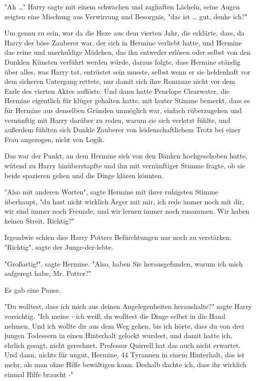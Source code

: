 {"Ah …" Harry sagte mit einem schwachen und zaghaften Lächeln, seine Augen zeigten eine Mischung aus Verwirrung und Besorgnis, "das ist … gut, denke ich?"

Um genau zu sein, war da die Hexe aus dem vierten Jahr, die erklärte, dass, da Harry der böse Zauberer war, der sich in Hermine verliebt hatte, und Hermine das reine und unschuldige Mädchen, das ihn entweder erlösen oder selbst von den Dunklen Künsten verführt werden würde, daraus folgte, dass Hermine ständig über alles, was Harry tat, entrüstet sein musste, selbst wenn er sie heldenhaft vor dem sicheren Untergang rettete, nur damit sich ihre Romanze nicht vor dem Ende des vierten Aktes auflöste. Und dann hatte Penelope Clearwater, die Hermine eigentlich für klüger gehalten hatte, mit lauter Stimme bemerkt, dass es für Hermine aus denselben Gründen unmöglich war, einfach rüberzugehen und vernünftig mit Harry darüber zu reden, warum sie sich verletzt fühlte, und außerdem fühlten sich Dunkle Zauberer von leidenschaftlichem Trotz bei einer Frau angezogen, nicht von Logik.

Das war der Punkt, an dem Hermine sich von den Bänken hochgeschoben hatte, wütend zu Harry hinüberstapfte und ihn mit vernünftiger Stimme fragte, ob sie beide spazieren gehen und die Dinge klären könnten.

"Also mit anderen Worten", sagte Hermine mit ihrer ruhigsten Stimme überhaupt, "du hast nicht wirklich Ärger mit mir, ich rede immer noch mit dir, wir sind immer noch Freunde, und wir lernen immer noch zusammen. Wir haben keinen Streit. Richtig?"

Irgendwie schien dies Harry Potters Befürchtungen nur noch zu verstärken.\\ "Richtig", sagte der Junge-der-lebte.

"Großartig!", sagte Hermine. "Also, haben Sie herausgefunden, warum ich mich aufgeregt habe, Mr. Potter?"

Es gab eine Pause.

"Du wolltest, dass ich mich aus deinen Angelegenheiten heraushalte?" sagte Harry vorsichtig. "Ich meine - ich weiß, du wolltest die Dinge selbst in die Hand nehmen. Und ich wollte dir aus dem Weg gehen, bis ich hörte, dass du von drei jungen Todessern in einen Hinterhalt gelockt wurdest, und damit hatte ich, ehrlich gesagt, nicht gerechnet. Professor Quirrell hat das auch nicht erwartet. Und dann, nichts für ungut, Hermine, 44 Tyrannen in einem Hinterhalt, das ist mehr, als man ohne Hilfe bewältigen kann. Deshalb dachte ich, dass ihr wirklich einmal Hilfe braucht -"

}
